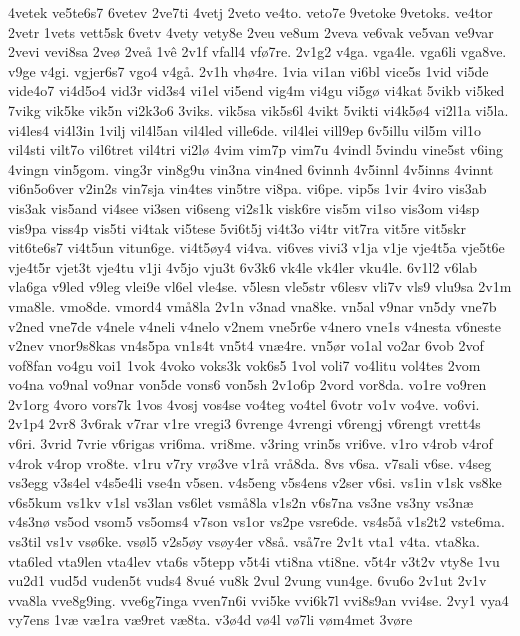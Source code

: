 {4vetek
ve5te6s7
6vetev
2ve7ti
4vetj
2veto
ve4to.
veto7e
9vetoke
9vetoks.
ve4tor
2vetr
1vets
vett5sk
6vetv
4vety
vety8e
2veu
ve8um
2veva
ve6vak
ve5van
ve9var
2vevi
vevi8sa
2ve^^f8
2ve^^e5
1v^^ea
2v1f
vfall4
vf^^f87re.
2v1g2
v4ga.
vga4le.
vga6li
vga8ve.
v9ge
v4gi.
vgjer6s7
vgo4
v4g^^e5.
2v1h
vh^^f84re.
1via
vi1an
vi6bl
vice5s
1vid
vi5de
vide4o7
vi4d5o4
vid3r
vid3s4
vi1el
vi5end
vig4m
vi4gu
vi5g^^f8
vi4kat
5vikb
vi5ked
7vikg
vik5ke
vik5n
vi2k3o6
3viks.
vik5sa
vik5s6l
4vikt
5vikti
vi4k5^^f84
vi2l1a
vi5la.
vi4les4
vi4l3in
1vilj
vil4l5an
vil4led
ville6de.
vil4lei
vill9ep
6v5illu
vil5m
vil1o
vil4sti
vilt7o
vil6tret
vil4tri
vi2l^^f8
4vim
vim7p
vim7u
4vindl
5vindu
vine5st
v6ing
4vingn
vin5gom.
ving3r
vin8g9u
vin3na
vin4ned
6vinnh
4v5innl
4v5inns
4vinnt
vi6n5o6ver
v2in2s
vin7sja
vin4tes
vin5tre
vi8pa.
vi6pe.
vip5s
1vir
4viro
vis3ab
vis3ak
vis5and
vi4see
vi3sen
vi6seng
vi2s1k
visk6re
vis5m
vi1so
vis3om
vi4sp
vis9pa
viss4p
vis5ti
vi4tak
vi5tese
5vi6t5j
vi4t3o
vi4tr
vit7ra
vit5re
vit5skr
vit6te6s7
vi4t5un
vitun6ge.
vi4t5^^f8y4
vi4va.
vi6ves
vivi3
v1ja
v1je
vje4t5a
vje5t6e
vje4t5r
vjet3t
vje4tu
v1ji
4v5jo
vju3t
6v3k6
vk4le
vk4ler
vku4le.
6v1l2
v6lab
vla6ga
v9led
v9leg
vlei9e
vl6el
vle4se.
v5lesn
vle5str
v6lesv
vli7v
vls9
vlu9sa
2v1m
vma8le.
vmo8de.
vmord4
vm^^e58la
2v1n
v3nad
vna8ke.
vn5al
v9nar
vn5dy
vne7b
v2ned
vne7de
v4nele
v4neli
v4nelo
v2nem
vne5r6e
v4nero
vne1s
v4nesta
v6neste
v2nev
vnor9s8kas
vn4s5pa
vn1s4t
vn5t4
vn^^e64re.
vn5^^f8r
vo1al
vo2ar
6vob
2vof
vof8fan
vo4gu
voi1
1vok
4voko
voks3k
vok6s5
1vol
voli7
vo4litu
vol4tes
2vom
vo4na
vo9nal
vo9nar
von5de
vons6
von5sh
2v1o6p
2vord
vor8da.
vo1re
vo9ren
2v1org
4voro
vors7k
1vos
4vosj
vos4se
vo4teg
vo4tel
6votr
vo1v
vo4ve.
vo6vi.
2v1p4
2vr8
3v6rak
v7rar
v1re
vregi3
6vrenge
4vrengi
v6rengj
v6rengt
vrett4s
v6ri.
3vrid
7vrie
v6rigas
vri6ma.
vri8me.
v3ring
vrin5s
vri6ve.
v1ro
v4rob
v4rof
v4rok
v4rop
vro8te.
v1ru
v7ry
vr^^f83ve
v1r^^e5
vr^^e58da.
8vs
v6sa.
v7sali
v6se.
v4seg
vs3egg
v3s4el
v4s5e4li
vse4n
v5sen.
v4s5eng
v5s4ens
v2ser
v6si.
vs1in
v1sk
vs8ke
v6s5kum
vs1kv
v1sl
vs3lan
vs6let
vsm^^e58la
v1s2n
v6s7na
vs3ne
vs3ny
vs3n^^e6
v4s3n^^f8
vs5od
vsom5
vs5oms4
v7son
vs1or
vs2pe
vsre6de.
vs4s5^^e5
v1s2t2
vste6ma.
vs3til
vs1v
vs^^f86ke.
vs^^f8l5
v2s5^^f8y
vs^^f8y4er
v8s^^e5.
vs^^e57re
2v1t
vta1
v4ta.
vta8ka.
vta6led
vta9len
vta4lev
vta6s
v5tepp
v5t4i
vti8na
vti8ne.
v5t4r
v3t2v
vty8e
1vu
vu2d1
vud5d
vuden5t
vuds4
8vu^^e9
vu8k
2vul
2vung
vun4ge.
6vu6o
2v1ut
2v1v
vva8la
vve8g9ing.
vve6g7inga
vven7n6i
vvi5ke
vvi6k7l
vvi8s9an
vvi4se.
2vy1
vya4
vy7ens
1v^^e6
v^^e61ra
v^^e69ret
v^^e68ta.
v3^^f84d
v^^f84l
v^^f87li
v^^f8m4met
3v^^f8re
}
